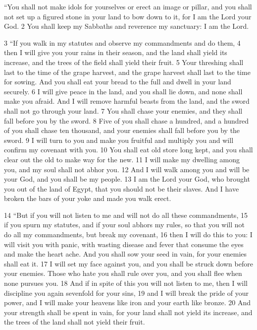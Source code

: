 \begin{bible}

``You shall not make idols for yourselves or erect an image or pillar, and you shall not set up a figured stone in your land to bow down to it, for I am the Lord your God. 2 You shall keep my Sabbaths and reverence my sanctuary: I am the Lord.

3 ``If you walk in my statutes and observe my commandments and do them, 4 then I will give you your rains in their season, and the land shall yield its increase, and the trees of the field shall yield their fruit. 5 Your threshing shall last to the time of the grape harvest, and the grape harvest shall last to the time for sowing. And you shall eat your bread to the full and dwell in your land securely. 6 I will give peace in the land, and you shall lie down, and none shall make you afraid. And I will remove harmful beasts from the land, and the sword shall not go through your land. 7 You shall chase your enemies, and they shall fall before you by the sword. 8 Five of you shall chase a hundred, and a hundred of you shall chase ten thousand, and your enemies shall fall before you by the sword. 9 I will turn to you and make you fruitful and multiply you and will confirm my covenant with you. 10 You shall eat old store long kept, and you shall clear out the old to make way for the new. 11 I will make my dwelling among you, and my soul shall not abhor you. 12 And I will walk among you and will be your God, and you shall be my people. 13 I am the Lord your God, who brought you out of the land of Egypt, that you should not be their slaves. And I have broken the bars of your yoke and made you walk erect.

14 ``But if you will not listen to me and will not do all these commandments, 15 if you spurn my statutes, and if your soul abhors my rules, so that you will not do all my commandments, but break my covenant, 16 then I will do this to you: I will visit you with panic, with wasting disease and fever that consume the eyes and make the heart ache. And you shall sow your seed in vain, for your enemies shall eat it. 17 I will set my face against you, and you shall be struck down before your enemies. Those who hate you shall rule over you, and you shall flee when none pursues you. 18 And if in spite of this you will not listen to me, then I will discipline you again sevenfold for your sins, 19 and I will break the pride of your power, and I will make your heavens like iron and your earth like bronze. 20 And your strength shall be spent in vain, for your land shall not yield its increase, and the trees of the land shall not yield their fruit.


\end{bible}
